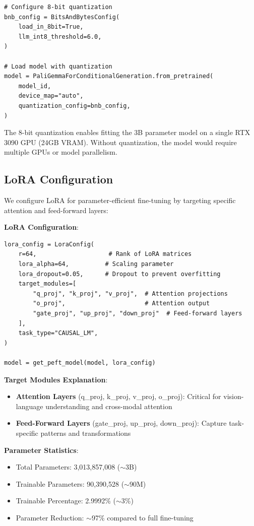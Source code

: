 \documentclass[conference]{IEEEtran}
\begin{document}
\begin{lstlisting}[caption={Model Loading with 8-bit Quantization}]
# Configure 8-bit quantization
bnb_config = BitsAndBytesConfig(
    load_in_8bit=True,
    llm_int8_threshold=6.0,
)

# Load model with quantization
model = PaliGemmaForConditionalGeneration.from_pretrained(
    model_id,
    device_map="auto",
    quantization_config=bnb_config,
)
\end{lstlisting}

The 8-bit quantization enables fitting the 3B parameter model on a single RTX 3090 GPU (24GB VRAM). Without quantization, the model would require multiple GPUs or model parallelism.

\subsection{LoRA Configuration}

We configure LoRA for parameter-efficient fine-tuning by targeting specific attention and feed-forward layers:

\textbf{LoRA Configuration}:

\begin{lstlisting}[caption={LoRA Configuration}]
lora_config = LoraConfig(
    r=64,                    # Rank of LoRA matrices
    lora_alpha=64,          # Scaling parameter
    lora_dropout=0.05,      # Dropout to prevent overfitting
    target_modules=[
        "q_proj", "k_proj", "v_proj",  # Attention projections
        "o_proj",                      # Attention output
        "gate_proj", "up_proj", "down_proj"  # Feed-forward layers
    ],
    task_type="CAUSAL_LM",
)

model = get_peft_model(model, lora_config)
\end{lstlisting}

\textbf{Target Modules Explanation}:
\begin{itemize}
    \item \textbf{Attention Layers} (q\_proj, k\_proj, v\_proj, o\_proj): Critical for vision-language understanding and cross-modal attention
    \item \textbf{Feed-Forward Layers} (gate\_proj, up\_proj, down\_proj): Capture task-specific patterns and transformations
\end{itemize}

\textbf{Parameter Statistics}:
\begin{itemize}
    \item Total Parameters: 3,013,857,008 ($\sim$3B)
    \item Trainable Parameters: 90,390,528 ($\sim$90M)
    \item Trainable Percentage: 2.9992\% ($\sim$3\%)
    \item Parameter Reduction: $\sim$97\% compared to full fine-tuning
\end{itemize}
\end{document}
